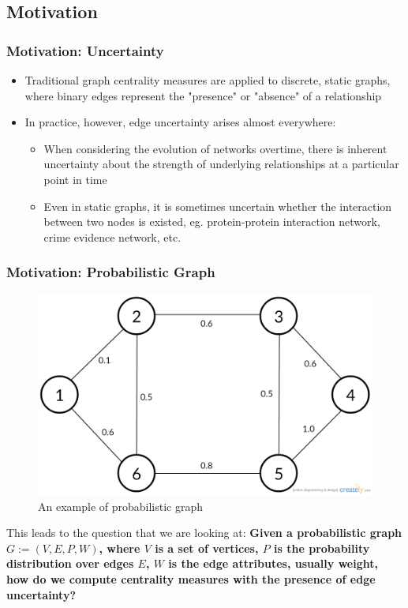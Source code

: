\documentclass[9pt]{beamer}
\begin{document}

\subsection{Motivation}
\begin{frame}
\frametitle{Motivation: Uncertainty}
\begin{itemize}
\item Traditional graph centrality measures are applied to discrete, static graphs, where binary edges represent the "presence" or "absence" of a relationship
\item In practice, however, edge uncertainty arises almost everywhere:
\begin{itemize}
\item When considering the evolution of networks overtime, there is inherent uncertainty about the strength of underlying relationships at a particular point in time
\item Even in static graphs, it is sometimes uncertain whether the interaction between two nodes is existed, eg. protein-protein interaction network, crime evidence network, etc.
\end{itemize}
\end{itemize}
\end{frame}

\begin{frame}
\frametitle{Motivation: Probabilistic Graph}
\begin{figure}[H]
\centering
\includegraphics[scale = 0.2]{probabilistic_graph.png}
\caption{An example of probabilistic graph}
\end{figure}
\vspace{-0.28in}
This leads to the question that we are looking at: \textbf{Given a probabilistic graph $G := (V,E,P,W)$, where $V$ is a set of vertices, $P$ is the probability distribution over edges $E$, $W$ is the edge attributes, usually weight, how do we compute centrality measures with the presence of edge uncertainty?}
\end{frame}
\end{document}
